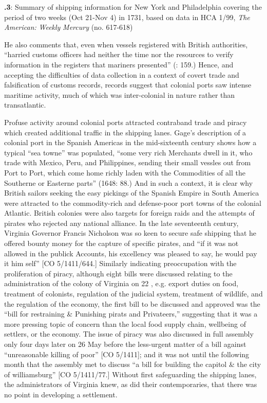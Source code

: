 \textbf{.3}: Summary of shipping information for New York and Philadelphia covering the period of two weeks (Oct 21-Nov 4) in 1731, based on data in HCA 1/99, \textit{The} \textit{American:} \textit{Weekly} \textit{Mercury} (no. 617-618) 

  
 

He also comments that, even when vessels registered with British authorities, “harried customs officers had neither the time nor the resources to verify information in the registers that mariners presented” (\citealt{Jarvis2010}: 159.) Hence, and accepting the difficulties of data collection in a context of covert trade and falsification of customs records, records suggest that colonial ports saw intense maritime activity, much of which was inter-colonial in nature rather than transatlantic. 

Profuse activity around colonial ports attracted contraband trade and piracy which created additional traffic in the shipping lanes. Gage’s description of a colonial port in the Spanish Americas in the mid-sixteenth century shows how a typical “sea towne” was populated, “some very rich Merchants dwell in it, who trade with Mexico, Peru, and Philippines, sending their small vessles out from Port to Port, which come home richly laden with the Commodities of all the Southerne or Easterne parts” (1648: 88.) And in such a context, it is clear why British sailors seeking the easy pickings of the Spanish Empire in South America were attracted to the commodity-rich and defense-poor port towns of the colonial Atlantic. British colonies were also targets for foreign raids and the attempts of pirates who rejected any national alliance. In the late seventeenth century, Virginia Governor Francis Nicholson was so keen to secure safe shipping that he offered bounty money for the capture of specific pirates, and “if it was not allowed in the publick Accounts, his excellency was pleased to say, he would pay it him self” [CO 5/1411/644.] Similarly indicating preoccupation with the proliferation of piracy, although eight bills were discussed relating to the administration of the colony of Virginia on 22 \citealt{May1699}, e.g. export duties on food, treatment of colonists, regulation of the judicial system, treatment of wildlife, and the regulation of the economy, the first bill to be discussed and approved was the “bill for restraining \& Punishing pirats and Privateers,” suggesting that it was a more pressing topic of concern than the local food supply chain, wellbeing of settlers, or the economy. The issue of piracy was also discussed in full assembly only four days later on 26 May before the less-urgent matter of a bill against “unreasonable killing of poor” [CO 5/1411]; and it was not until the following month that the assembly met to discuss “a bill for building the capitol \& the city of williamsburg” [CO 5/1411/77.] Without first safeguarding the shipping lanes, the administrators of Virginia knew, as did their contemporaries, that there was no point in developing a settlement. 

